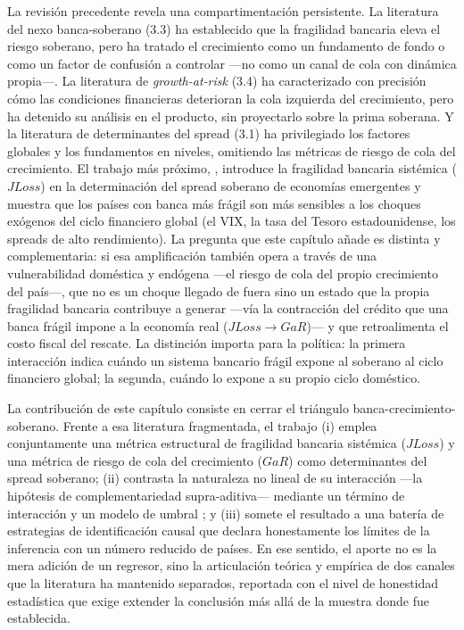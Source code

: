 La revisión precedente revela una compartimentación persistente. La literatura del nexo banca-soberano (3.3) ha establecido que la fragilidad bancaria eleva el riesgo soberano, pero ha tratado el crecimiento como un fundamento de fondo o como un factor de confusión a controlar —no como un canal de cola con dinámica propia—. La literatura de \textit{growth-at-risk} (3.4) ha caracterizado con precisión cómo las condiciones financieras deterioran la cola izquierda del crecimiento, pero ha detenido su análisis en el producto, sin proyectarlo sobre la prima soberana. Y la literatura de determinantes del spread (3.1) ha privilegiado los factores globales y los fundamentos en niveles, omitiendo las métricas de riesgo de cola del crecimiento. El trabajo más próximo, \citet{Chari2024b}, introduce la fragilidad bancaria sistémica ($JLoss$) en la determinación del spread soberano de economías emergentes y muestra que los países con banca más frágil son más sensibles a los choques exógenos del ciclo financiero global (el VIX, la tasa del Tesoro estadounidense, los spreads de alto rendimiento). La pregunta que este capítulo añade es distinta y complementaria: si esa amplificación también opera a través de una vulnerabilidad doméstica y endógena —el riesgo de cola del propio crecimiento del país—, que no es un choque llegado de fuera sino un estado que la propia fragilidad bancaria contribuye a generar —vía la contracción del crédito que una banca frágil impone a la economía real ($JLoss\to GaR$)— y que retroalimenta el costo fiscal del rescate. La distinción importa para la política: la primera interacción indica cuándo un sistema bancario frágil expone al soberano al ciclo financiero global; la segunda, cuándo lo expone a su propio ciclo doméstico.

La contribución de este capítulo consiste en cerrar el triángulo banca-crecimiento-soberano. Frente a esa literatura fragmentada, el trabajo (i) emplea conjuntamente una métrica estructural de fragilidad bancaria sistémica ($JLoss$) y una métrica de riesgo de cola del crecimiento ($GaR$) como determinantes del spread soberano; (ii) contrasta la naturaleza no lineal de su interacción —la hipótesis de complementariedad supra-aditiva— mediante un término de interacción y un modelo de umbral \citep{Hansen2000}; y (iii) somete el resultado a una batería de estrategias de identificación causal que declara honestamente los límites de la inferencia con un número reducido de países. En ese sentido, el aporte no es la mera adición de un regresor, sino la articulación teórica y empírica de dos canales que la literatura ha mantenido separados, reportada con el nivel de honestidad estadística que exige extender la conclusión más allá de la muestra donde fue establecida.

